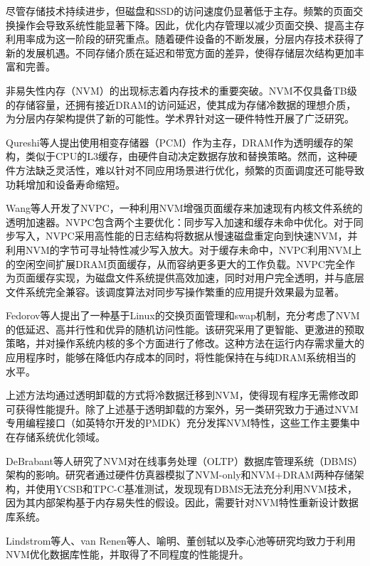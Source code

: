 尽管存储技术持续进步，但磁盘和SSD的访问速度仍显著低于主存。频繁的页面交换操作会导致系统性能显著下降。因此，优化内存管理以减少页面交换、提高主存利用率成为这一阶段的研究重点。随着硬件设备的不断发展，分层内存技术获得了新的发展机遇。不同存储介质在延迟和带宽方面的差异，使得存储层次结构更加丰富和完善。

非易失性内存（NVM）的出现标志着内存技术的重要突破。NVM不仅具备TB级的存储容量，还拥有接近DRAM的访问延迟，使其成为存储冷数据的理想介质，为分层内存架构提供了新的可能性。学术界针对这一硬件特性开展了广泛研究。

Qureshi等人提出使用相变存储器（PCM）作为主存，DRAM作为透明缓存的架构，类似于CPU的L3缓存，由硬件自动决定数据存放和替换策略。然而，这种硬件方法缺乏灵活性，难以针对不同应用场景进行优化，频繁的页面调度还可能导致功耗增加和设备寿命缩短。

Wang等人开发了NVPC，一种利用NVM增强页面缓存来加速现有内核文件系统的透明加速器。NVPC包含两个主要优化：同步写入加速和缓存未命中优化。对于同步写入，NVPC采用高性能的日志结构将数据从慢速磁盘重定向到快速NVM，并利用NVM的字节可寻址特性减少写入放大。对于缓存未命中，NVPC利用NVM上的空闲空间扩展DRAM页面缓存，从而容纳更多更大的工作负载。NVPC完全作为页面缓存实现，为磁盘文件系统提供高效加速，同时对用户完全透明，并与底层文件系统完全兼容。该调度算法对同步写操作繁重的应用提升效果最为显著。

Fedorov等人提出了一种基于Linux的交换页面管理和swap机制，充分考虑了NVM的低延迟、高并行性和优异的随机访问性能。该研究采用了更智能、更激进的预取策略，并对操作系统内核的多个方面进行了修改。这种方法在运行内存需求量大的应用程序时，能够在降低内存成本的同时，将性能保持在与纯DRAM系统相当的水平。

上述方法均通过透明卸载的方式将冷数据迁移到NVM，使得现有程序无需修改即可获得性能提升。除了上述基于透明卸载的方案外，另一类研究致力于通过NVM专用编程接口（如英特尔开发的PMDK）充分发挥NVM特性，这些工作主要集中在存储系统优化领域。

DeBrabant等人研究了NVM对在线事务处理（OLTP）数据库管理系统（DBMS）架构的影响。研究者通过硬件仿真器模拟了NVM-only和NVM+DRAM两种存储架构，并使用YCSB和TPC-C基准测试，发现现有DBMS无法充分利用NVM技术，因为其内部架构基于内存易失性的假设。因此，需要针对NVM特性重新设计数据库系统。

Lindstrom等人、van Renen等人、喻明、董创轼以及李心池等研究均致力于利用NVM优化数据库性能，并取得了不同程度的性能提升。

